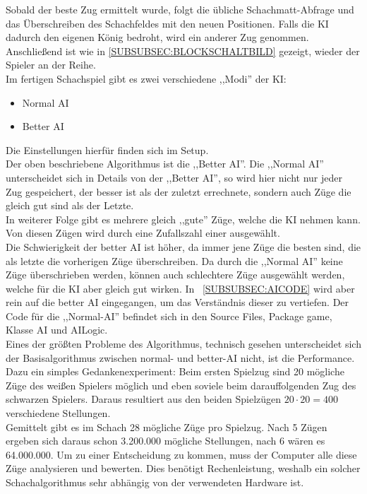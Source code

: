 \documentclass[12pt,a4paper]{article}
\begin{document}
{Sobald der beste Zug ermittelt wurde, folgt die übliche Schachmatt-Abfrage und das Überschreiben des Schachfeldes mit den neuen Positionen. Falls die KI dadurch den eigenen König bedroht, wird ein anderer Zug genommen. Anschließend ist wie in \ref{SUBSUBSEC:BLOCKSCHALTBILD} gezeigt, wieder der Spieler an der Reihe. \\[2ex]
Im fertigen Schachspiel gibt es zwei verschiedene ,,Modi'' der KI:
\begin{itemize}
	\item{Normal AI}
	\item{Better AI}
\end{itemize}
Die Einstellungen hierfür finden sich im Setup.\\
Der oben beschriebene Algorithmus ist die ,,Better AI''. Die ,,Normal AI'' unterscheidet sich in Details von der ,,Better AI'', so wird hier nicht nur jeder Zug gespeichert, der besser ist als der zuletzt errechnete, sondern auch Züge die gleich gut sind als der Letzte. \\
In weiterer Folge gibt es mehrere gleich ,,gute'' Züge, welche die KI nehmen kann. Von diesen Zügen wird durch eine Zufallszahl einer ausgewählt. \\
Die Schwierigkeit der better AI ist höher, da immer jene Züge die besten sind, die als letzte die vorherigen Züge überschreiben. Da durch die ,,Normal AI'' keine Züge überschrieben werden, können auch schlechtere Züge ausgewählt werden, welche für die KI aber gleich gut wirken. In ~\ref{SUBSUBSEC:AICODE} wird aber rein auf die better AI eingegangen, um das Verständnis dieser zu vertiefen. Der Code für die ,,Normal-AI'' befindet sich in den Source Files, Package game, Klasse AI und AILogic. \\[2ex]
Eines der größten Probleme des Algorithmus, technisch gesehen unterscheidet sich der Basisalgorithmus zwischen normal- und better-AI nicht, ist die Performance. Dazu ein simples Gedankenexperiment: Beim ersten Spielzug sind 20 mögliche Züge des weißen Spielers möglich und eben soviele beim darauffolgenden Zug des schwarzen Spielers. Daraus resultiert aus den beiden Spielzügen \(20 \cdot 20 = 400\) verschiedene Stellungen. \\
Gemittelt gibt es im Schach 28 mögliche Züge pro Spielzug. Nach 5 Zügen ergeben sich daraus schon 3.200.000 mögliche Stellungen, nach 6 wären es 64.000.000. Um zu einer Entscheidung zu kommen, muss der Computer alle diese Züge analysieren und bewerten. Dies benötigt Rechenleistung, weshalb ein solcher Schachalgorithmus sehr abhängig von der verwendeten Hardware ist. \\[1ex]
}
\end{document}
